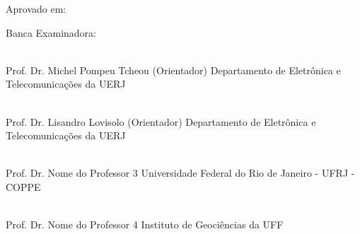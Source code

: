 \addtocounter{page}{+1}
\begin{center}

\setNomeAluno

\vspace{1cm}

\textbf{\setTitulo}

\end{center}

\vspace{.4cm}

\begin{flushright}
\parbox{8cm}{
}
\end{flushright}

\vspace{.6cm}



\noindent Aprovado em: \setApprovalDate

\noindent Banca Examinadora:


%
%
%
%



\vspace{.7cm}

\begin{flushright}
\parbox{12cm}{

\singlespacing

\hrulefill \\

\vspace{-.4cm}
Prof. Dr. Michel Pompeu Tcheou (Orientador)
\newline
Departamento de Eletrônica e Telecomunicações  da UERJ
\vspace{.7cm}

\hrulefill \\

\vspace{-.4cm}
Prof. Dr. Lisandro Lovisolo (Orientador)
\newline
Departamento de Eletrônica e Telecomunicações  da UERJ
\vspace{.7cm}


\hrulefill \\

\vspace{-.4cm}
Prof. Dr. Nome do Professor 3
\newline
Universidade Federal do Rio de Janeiro - UFRJ - COPPE
\vspace{.7cm}

\hrulefill \\

\vspace{-.4cm}
Prof. Dr. Nome do Professor 4
\newline
Instituto de Geociências da UFF
\vspace{.7cm}
}
\end{flushright}
\vfill

\begin{center}
\setLocationDate
\end{center}
